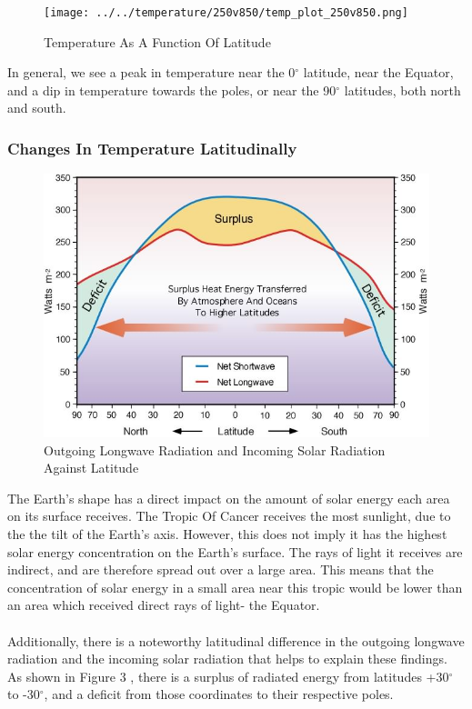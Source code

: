\documentclass[hidelinks]{article}
\begin{document}
\begin{figure}[h!]
	\centering
	\texttt{[image: ../../temperature/250v850/temp\_plot\_250v850.png]}
	\caption{Temperature As A Function Of Latitude}
\end{figure}
\noindent In general, we see a peak in temperature near the 0$^\circ$ latitude, near the Equator, and a dip in temperature towards the poles, or near the 90$^\circ$ latitudes, both north and south.
\subsubsection{Changes In Temperature Latitudinally}
\begin{figure}[h!]
	\centering
	\includegraphics[width=0.8\linewidth]{olrVisr_lat.jpg}
	\caption{Outgoing Longwave Radiation and Incoming Solar Radiation Against Latitude}
\end{figure}
\noindent
The Earth's shape has a direct impact on the amount of solar energy each area on its surface receives. The Tropic Of Cancer receives the most sunlight, due to the the tilt of the Earth's axis. However, this does not imply it has the highest solar energy concentration on the Earth's surface. The rays of light it receives are indirect, and are therefore spread out over a large area. This means that the concentration of solar energy in a small area near this tropic would be lower than an area which received direct rays of light- the Equator.
\\\\
Additionally, there is a noteworthy latitudinal difference in the outgoing longwave radiation and the incoming solar radiation that helps to explain these findings. As shown in Figure 3 \cite{phdthesis}, there is a surplus of radiated energy from latitudes +30$^\circ$ to -30$^\circ$, and a deficit from those coordinates to their respective poles.
\end{document}
